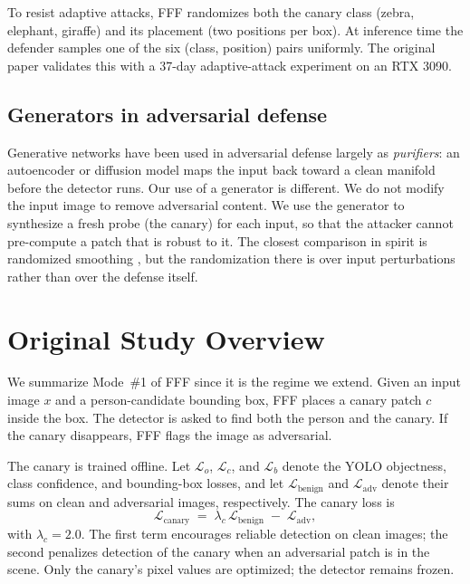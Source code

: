 \documentclass[conference]{IEEEtran}
\begin{document}
To resist adaptive attacks, FFF randomizes both the canary class (zebra,
elephant, giraffe) and its placement (two positions per box). At inference
time the defender samples one of the six (class, position) pairs uniformly.
The original paper validates this with a 37-day adaptive-attack experiment
on an RTX 3090.

\subsection{Generators in adversarial defense}

Generative networks have been used in adversarial defense largely as
\emph{purifiers}: an autoencoder or diffusion model maps the input back
toward a clean manifold before the detector runs. Our use of a generator
is different. We do not modify the input image to remove adversarial
content. We use the generator to synthesize a fresh probe (the canary) for
each input, so that the attacker cannot pre-compute a patch that is robust
to it. The closest comparison in spirit is randomized smoothing
\cite{liu2022segment}, but the randomization there is over input
perturbations rather than over the defense itself.

\section{Original Study Overview}
\label{sec:overview}

We summarize Mode~\#1 of FFF since it is the regime we extend. Given an
input image $x$ and a person-candidate bounding box, FFF places a canary
patch $c$ inside the box. The detector is asked to find both the person and
the canary. If the canary disappears, FFF flags the image as adversarial.

The canary is trained offline. Let $\mathcal{L}_o$, $\mathcal{L}_c$, and
$\mathcal{L}_b$ denote the YOLO objectness, class confidence, and
bounding-box losses, and let $\mathcal{L}_{\text{benign}}$ and
$\mathcal{L}_{\text{adv}}$ denote their sums on clean and adversarial
images, respectively. The canary loss is
\begin{equation}
    \mathcal{L}_{\text{canary}} \;=\; \lambda_c\,\mathcal{L}_{\text{benign}}
    \;-\; \mathcal{L}_{\text{adv}},
    \label{eq:fff}
\end{equation}
with $\lambda_c = 2.0$. The first term encourages reliable detection on
clean images; the second penalizes detection of the canary when an
adversarial patch is in the scene. Only the canary's pixel values are
optimized; the detector remains frozen.
\end{document}
